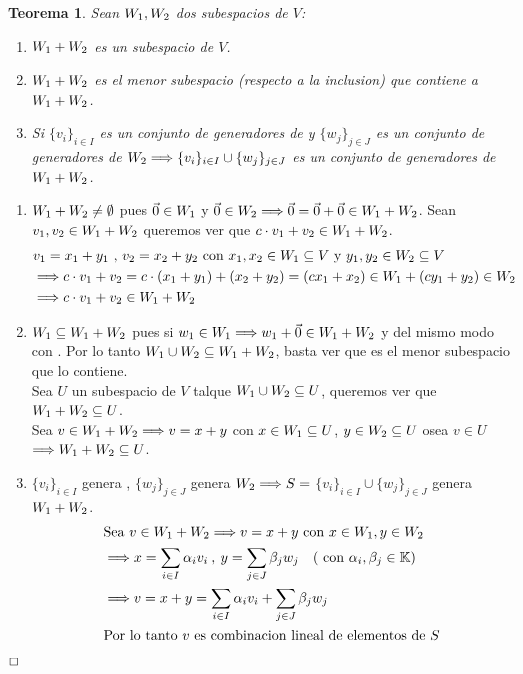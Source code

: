 \documentclass[]{article}
\newtheorem{theorem}{Teorema}
\newenvironment{proof}{\noindent{\bf Prueba:}}{$\hfill \Box$ \vspace{10pt}}
\newcommand{\kk}{
    \mathbb{K}
}
\newcommand{\ida}{\Longrightarrow}
\begin{document}
\begin{theorem}
    Sean $\text{$W_{1}$} , \text{$W_{2}$}$ dos subespacios de $V$:
    \begin{enumerate}
        \item $\text{$W_{1}$} + \text{$W_{2}$}$ es un subespacio de $V$.
        \item $\text{$W_{1}$} + \text{$W_{2}$}$ es el menor subespacio (respecto a la inclusion) que contiene a $\text{$W_{1}$}+\text{$W_{2}$}$.
        \item Si $\{ v_i \}_{i \in I}$ es un conjunto de generadores de  y $\{ w_j \}_{j \in J}$ es un conjunto
        de generadores de $\W{2} \ida \{ v_i \}_{i \in I} \cup \{ w_j \}_{j \in J}$ es un conjunto de generadores de $\text{$W_{1}$}+\text{$W_{2}$}$.
    \end{enumerate}
\end{theorem}
\begin{proof}
    \begin{enumerate}
        \item $\text{$W_{1}$} + \text{$W_{2}$} \neq \emptyset$ pues $\vec{0} \in \text{$W_{1}$}$ y $\vec{0} \in \W{2}\ida \vec{0}=\vec{0}+\vec{0} \in \W{1}+\W{2}$.
        Sean $v_1,v_2 \in \text{$W_{1}$}+\text{$W_{2}$}$ queremos ver que $c \cdot v_1 + v_2 \in \text{$W_{1}$} + \text{$W_{2}$}$.
        \begin{align*}
            &v_1 = x_1 + y_1 \text{ , } v_2= x_2 + y_2 \text{ con } x_1,x_2 \in \W{1} \subseteq V
            \text{ y } y_1,y_2 \in \W{2} \subseteq V\\
            &\ida c \cdot v_1 + v_2 = c \cdot (x_1 + y_1) + (x_2 + y_2) = 
            (cx_1 + x_2) \in  \W{1} + (cy_1 + y_2) \in \W{2}\\
            &\ida c \cdot v_1 + v_2 \in \W{1} + \W{2}
        \end{align*}
        \item $\text{$W_{1}$} \subseteq \text{$W_{1}$} + \text{$W_{2}$}$ pues si $w_1 \in \W{1} \ida w_1 + \vec{0} \in \W{1}+\W{2}$ y del mismo modo con .
        Por lo tanto $\text{$W_{1}$} \cup \text{$W_{2}$} \subseteq \text{$W_{1}$} + \text{$W_{2}$}$, basta ver que es el menor subespacio que lo contiene.\\
        Sea $U$ un subespacio de $V$ talque $\text{$W_{1}$} \cup \text{$W_{2}$} \subseteq U$, queremos ver que $\text{$W_{1}$} + \text{$W_{2}$} \subseteq U$.\\
        Sea $v \in \W{1} + \W{2} \ida v=x+y$ con $x \in \text{$W_{1}$} \subseteq U$, $y \in \text{$W_{2}$} \subseteq U$ osea $v \in U$
        $\ida \W{1} + \W{2} \subseteq U$.
        \item $\{v_i\}_{i \in I}$ genera , $\{w_j\}_{j \in J}$ genera $\W{2} \ida S=$
        $\{v_i\}_{i \in I} \cup \{w_j\}_{j \in J}$ genera $\text{$W_{1}$} + \text{$W_{2}$}$.
        \begin{align*}
            &\text{Sea } v \in \W{1} + \W{2} \ida v=x+y \text{ con } x \in \W{1} , y \in \W{2}\\
            &\ida x=\sum_{i \in I} \alpha_i v_i \: , \: y=\sum_{j \in J} \beta_j w_j
            \quad (\text{ con } \alpha_i,\beta_j \in \kk)\\
            &\ida v=x+y=\sum_{i \in I}\alpha_i v_i + \sum_{j \in J}\beta_j w_j\\
            &\text{Por lo tanto $v$ es combinacion lineal de elementos de $S$}
        \end{align*}
    \end{enumerate}
\end{proof}
\end{document}
